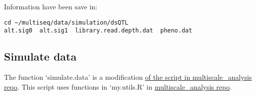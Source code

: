 \documentclass[11pt]{article}
\begin{document}
Information have been save in: 
\begin{lstlisting}
cd ~/multiseq/data/simulation/dsQTL
alt.sig0  alt.sig1  library.read.depth.dat  pheno.dat
\end{lstlisting}

\subsection{Simulate data}
\label{sec-2-2}
The function `simulate.data' is a modification \href{https://github.com/heejungshim/multiscale_analysis/blob/master/src/R/simulateDataForAll.run.multiscale.R}{of the script in multiscale\_analysis repo}. This script uses functions in `my.utils.R' in \href{https://github.com/heejungshim/multiscale_analysis/}{multiscale\_analysis repo}.
\end{document}

